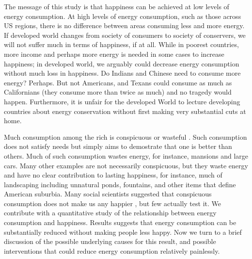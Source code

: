 \documentclass[10pt, letterpaper]{article}
\begin{document}
\begin{spacing}{1.4}
The message of this study is that happiness can be achieved at low levels of
energy consumption. At high levels of energy consumption, such as
those across US regions, there is no difference between areas consuming less and more
energy. If developed world changes from society of consumers
to society of conservers, we will not suffer much in terms of
happiness, if at all.  While in poorest countries, more  income and perhaps more energy
 is needed in some cases to increase happiness; in developed world, we arguably could  decrease
energy consumption without much loss in happiness. %
Do Indians and Chinese need to consume more energy? Perhaps. But not Americans, and
Texans could consume as much as Californians (they consume more than twice as
much) and no tragedy would
happen. %
Furthermore, it is unfair for the developed World to lecture developing
countries about energy conservation without first making very substantial cuts
at home.

Much consumption among the rich is conspicuous or
wasteful \cite{veblen05a, veblen05b}. Such consumption does not satisfy needs
but simply aims to demostrate that
one is better than others. Much of such consumption  wastes energy, for
instance, mansions and large cars.  Many other examples are not necessarily conspicuous, 
but they waste energy and have no clear contribution to lasting happiness, for
instance, much of landscaping including unnatural ponds, fountains, and other items that
define American suburbia. Many social scientists suggested that conspicuous consumption
does not make us any happier  \cite{csikszentmihalyi99, frank04, frank05, frank12}, but few actually test it. We contribute with a quantitative study of
the relationship between energy consumption and happiness. %
 Results suggests that  energy consumption can be substantially reduced
without making people less happy.  Now we turn to a brief  discussion of the possible underlying causes for
this result, and  possible interventions that could reduce energy consumption
 relatively painlessly. 


\end{spacing}
\end{document}
